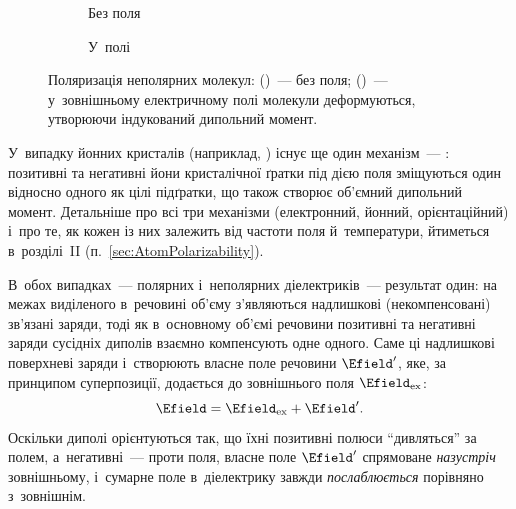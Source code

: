 \begin{itemize}
	      \begin{figure}[h!]
		      \centering
		      \begin{subfigure}[t]{0.48\linewidth}
			      \centering
			      \caption{Без поля}
			      \label{pic:NonPolarNoField}
		      \end{subfigure}\hfill
		      \begin{subfigure}[t]{0.48\linewidth}
			      \centering
			      \caption{У~полі}
			      \label{pic:NonPolarField}
		      \end{subfigure}
		      \caption{Поляризація неполярних молекул:
		      (\protect{})~--- без поля;
		      (\protect{})~--- у~зовнішньому електричному полі
		      молекули деформуються, утворюючи індукований дипольний момент.}
		      \label{pic:PolarizationNonPolar}
	      \end{figure}
\end{itemize}

У~випадку йонних кристалів (наприклад, ) існує ще один механізм~---
: позитивні та негативні йони кристалічної ґратки під дією поля
зміщуються один відносно одного як цілі підґратки, що також створює об'ємний дипольний
момент. Детальніше про всі три механізми (електронний, йонний, орієнтаційний) і~про те, як
кожен із них залежить від частоти поля й~температури, йтиметься в~розділі~II
(п.~\ref{sec:AtomPolarizability}).

В~обох випадках~--- полярних і~неполярних діелектриків~--- результат один: на межах
виділеного в~речовині об'єму з'являються надлишкові (некомпенсовані) зв'язані заряди, тоді
як в~основному об'ємі речовини позитивні та негативні заряди сусідніх диполів взаємно
компенсують одне одного. Саме ці надлишкові поверхневі заряди і~створюють власне поле
речовини $\Efield'$, яке, за принципом суперпозиції, додається до зовнішнього поля
$\Efield_\text{ex}$:
\begin{equation*}
	\Efield = \Efield_\text{ex} + \Efield'.
\end{equation*}
Оскільки диполі орієнтуються так, що їхні позитивні полюси \enquote{дивляться} за полем,
а~негативні~--- проти поля, власне поле $\Efield'$ спрямоване \emph{назустріч}
зовнішньому, і~сумарне поле в~діелектрику завжди \emph{послаблюється} порівняно
з~зовнішнім.


